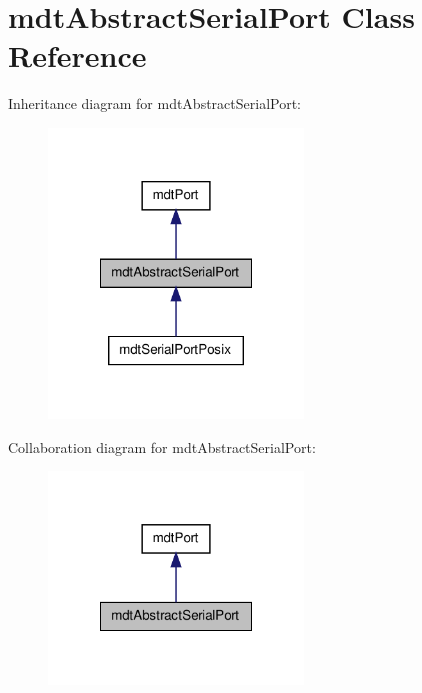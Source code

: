 \hypertarget{classmdt_abstract_serial_port}{
\section{mdtAbstractSerialPort Class Reference}
\label{classmdt_abstract_serial_port}
}


Inheritance diagram for mdtAbstractSerialPort:\nopagebreak
\begin{figure}[H]
\begin{center}
\leavevmode
\includegraphics[width=192pt]{classmdt_abstract_serial_port__inherit__graph}
\end{center}
\end{figure}


Collaboration diagram for mdtAbstractSerialPort:\nopagebreak
\begin{figure}[H]
\begin{center}
\leavevmode
\includegraphics[width=192pt]{classmdt_abstract_serial_port__coll__graph}
\end{center}
\end{figure}
